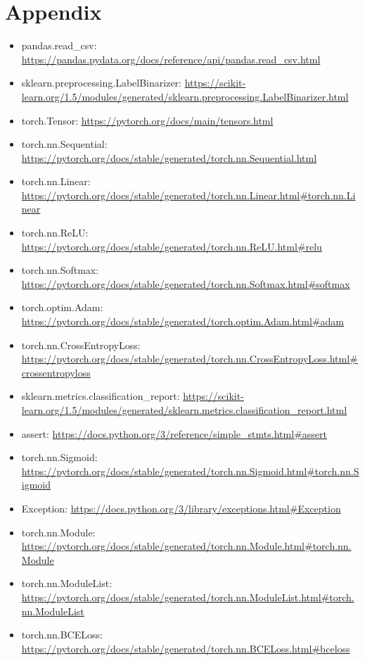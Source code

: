 \documentclass[11pt, a4paper]{article}
\begin{document}
\section*{Appendix}

\begin{itemize}  
	\item pandas.read\_csv: \url{https://pandas.pydata.org/docs/reference/api/pandas.read_csv.html}
	\item sklearn.preprocessing.LabelBinarizer: \url{https://scikit-learn.org/1.5/modules/generated/sklearn.preprocessing.LabelBinarizer.html}
	\item torch.Tensor: \url{https://pytorch.org/docs/main/tensors.html}
	\item torch.nn.Sequential: \url{https://pytorch.org/docs/stable/generated/torch.nn.Sequential.html}
	\item torch.nn.Linear: \url{https://pytorch.org/docs/stable/generated/torch.nn.Linear.html#torch.nn.Linear}
	\item torch.nn.ReLU: \url{https://pytorch.org/docs/stable/generated/torch.nn.ReLU.html#relu}
	\item torch.nn.Softmax: \url{https://pytorch.org/docs/stable/generated/torch.nn.Softmax.html#softmax}
	\item torch.optim.Adam: \url{https://pytorch.org/docs/stable/generated/torch.optim.Adam.html#adam}
	\item torch.nn.CrossEntropyLoss: \url{https://pytorch.org/docs/stable/generated/torch.nn.CrossEntropyLoss.html#crossentropyloss}
	\item sklearn.metrics.classification\_report: \url{https://scikit-learn.org/1.5/modules/generated/sklearn.metrics.classification_report.html}
	\item assert: \url{https://docs.python.org/3/reference/simple_stmts.html#assert}
	\item torch.nn.Sigmoid: \url{https://pytorch.org/docs/stable/generated/torch.nn.Sigmoid.html#torch.nn.Sigmoid}
	\item Exception: \url{https://docs.python.org/3/library/exceptions.html#Exception}
	\item torch.nn.Module: \url{https://pytorch.org/docs/stable/generated/torch.nn.Module.html#torch.nn.Module}
	\item torch.nn.ModuleList: \url{https://pytorch.org/docs/stable/generated/torch.nn.ModuleList.html#torch.nn.ModuleList}
	\item torch.nn.BCELoss: \url{https://pytorch.org/docs/stable/generated/torch.nn.BCELoss.html#bceloss}

\end{itemize}
\end{document}
